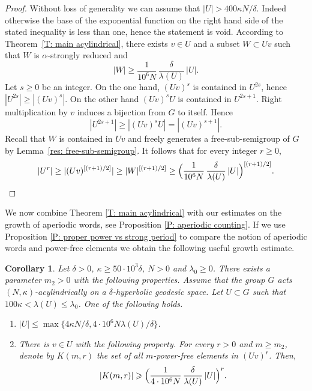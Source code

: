 \documentclass[JEP,XML,SOM,Unicode, NoEqCountersInSection,published]{cedram}
\theoremstyle{plain}
\newtheorem{cor}[thm]{Corollary}
\theoremstyle{definition}
\begin{document}
\begin{proof}
Without loss of generality we can assume that $|U| > 400\kappa N /\delta$.
Indeed otherwise the base of the exponential function on the right hand side of the stated inequality is less than one, hence the statement is void.
According to Theorem~\ref{T: main acylindrical}, there exists $v \in U$ and a subset $W \subset Uv$ such that $W$ is $\alpha$-strongly reduced and
\begin{equation*}
|W| \geq \frac 1{10^6N}\,\frac \delta{\lambda(U)}\, |U|.
\end{equation*}
Let $s \geq 0$ be an integer.
On the one hand, $(Uv)^s$ is contained in $U^{2s}$, hence $|U^{2s}| \geq |(Uv)^s|$.
On the other hand $(Uv)^sU$ is contained in $U^{2s+1}$.
Right multiplication by $v$ induces a bijection from $G$ to itself.
Hence
\begin{equation*}
|U^{2s+1}| \geq |(Uv)^sU| = |(Uv)^{s+1}|.
\end{equation*}
Recall that $W$ is contained in $Uv$ and freely generates a free-sub-semigroup of $G$ by Lemma~\ref{res: free-sub-semigroup}.
It follows that for every integer $r \geq 0$,
\begin{equation*}
|U^r| \geq |(Uv)^{[(r+1)/2]}| \geq |W|^{[(r+1)/2]} \geq \Bigl( \frac 1{10^6N}\,\frac \delta{\lambda(U)}\, |U| \Bigr)^{[(r+1)/2]}.\qedhere
\end{equation*}
\end{proof}

We now combine Theorem \ref{T: main acylindrical} with our estimates on the growth of aperiodic words, see Proposition \ref{P: aperiodic counting}. If we use Proposition \ref{P: proper power vs strong period} to compare the notion of aperiodic words and power-free elements we obtain the following useful growth estimate.

\begin{cor}\label{T: main acylindrical power free}
Let $\delta >0$, $\kappa\geqslant 50\cdot 10^3\delta$, $N>0$ and $\lambda_0 \geq 0$.
There exists a parameter $m_2 > 0$ with the following properties.
Assume that the group $G$ acts $(N,\kappa)$-acylindrically on a $\delta$-hyperbolic geodesic space.
Let $U\subset G$ such that \hbox{$100\kappa \!<\!\lambda(U) \!\leq\! \lambda_0$}.
One of the following holds.
\begin{enumerate}
\item $\displaystyle |U| \leq \max\{4\kappa N/\delta, 4\cdot 10^6 N \lambda(U)/\delta\}$.
\item There is $v \in U$ with the following property.
For every $r > 0$ and $m \geq m_2$, denote by $K(m,r)$ the set of all $m$-power-free elements in $(Uv)^r$.
Then,
\[
|K(m,r)| \geqslant \Bigl( \frac{1}{4\cdot 10^6 N}\,\frac{\delta}{\lambda(U)}\, |U|\Bigr)^{r}. 
\]
\end{enumerate}

\end{cor}
\end{document}
